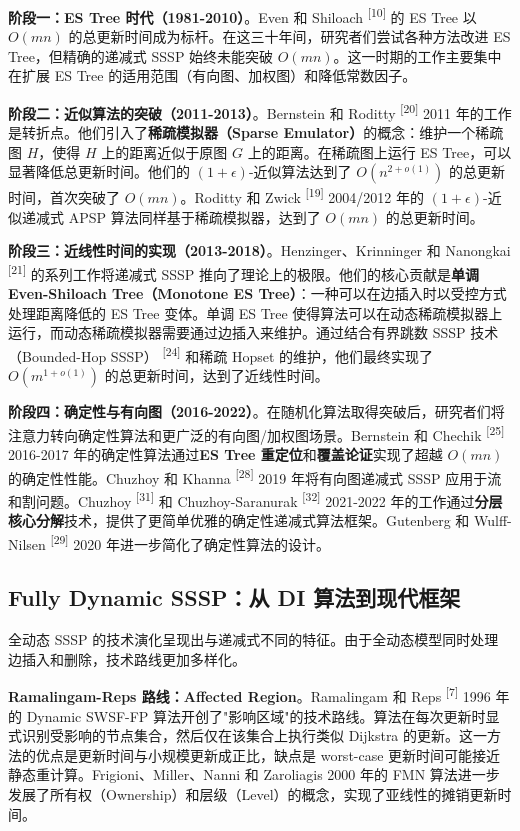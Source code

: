 \documentclass[12pt,a4paper]{ctexart}
\begin{document}
\textbf{阶段一：ES Tree 时代（1981-2010）}。Even 和 Shiloach \textsuperscript{[10]}  的 ES Tree 以 $O(mn)$ 的总更新时间成为标杆。在这三十年间，研究者们尝试各种方法改进 ES Tree，但精确的递减式 SSSP 始终未能突破 $O(mn)$。这一时期的工作主要集中在扩展 ES Tree 的适用范围（有向图、加权图）和降低常数因子。

\textbf{阶段二：近似算法的突破（2011-2013）}。Bernstein 和 Roditty \textsuperscript{[20]}  2011 年的工作是转折点。他们引入了\textbf{稀疏模拟器（Sparse Emulator）}的概念：维护一个稀疏图 $H$，使得 $H$ 上的距离近似于原图 $G$ 上的距离。在稀疏图上运行 ES Tree，可以显著降低总更新时间。他们的 $(1+\epsilon)$-近似算法达到了 $O(n^{2+o(1)})$ 的总更新时间，首次突破了 $O(mn)$。Roditty 和 Zwick \textsuperscript{[19]}  2004/2012 年的 $(1+\epsilon)$-近似递减式 APSP 算法同样基于稀疏模拟器，达到了 $O(mn)$ 的总更新时间。

\textbf{阶段三：近线性时间的实现（2013-2018）}。Henzinger、Krinninger 和 Nanongkai \textsuperscript{[21]}  的系列工作将递减式 SSSP 推向了理论上的极限。他们的核心贡献是\textbf{单调 Even-Shiloach Tree（Monotone ES Tree）}：一种可以在边插入时以受控方式处理距离降低的 ES Tree 变体。单调 ES Tree 使得算法可以在动态稀疏模拟器上运行，而动态稀疏模拟器需要通过边插入来维护。通过结合有界跳数 SSSP 技术（Bounded-Hop SSSP） \textsuperscript{[24]}  和稀疏 Hopset 的维护，他们最终实现了 $O(m^{1+o(1)})$ 的总更新时间，达到了近线性时间。

\textbf{阶段四：确定性与有向图（2016-2022）}。在随机化算法取得突破后，研究者们将注意力转向确定性算法和更广泛的有向图/加权图场景。Bernstein 和 Chechik \textsuperscript{[25]}  2016-2017 年的确定性算法通过\textbf{ES Tree 重定位}和\textbf{覆盖论证}实现了超越 $O(mn)$ 的确定性性能。Chuzhoy 和 Khanna \textsuperscript{[28]}  2019 年将有向图递减式 SSSP 应用于流和割问题。Chuzhoy \textsuperscript{[31]}  和 Chuzhoy-Saranurak \textsuperscript{[32]}  2021-2022 年的工作通过\textbf{分层核心分解}技术，提供了更简单优雅的确定性递减式算法框架。Gutenberg 和 Wulff-Nilsen \textsuperscript{[29]}  2020 年进一步简化了确定性算法的设计。

\subsection{Fully Dynamic SSSP：从 DI 算法到现代框架}

全动态 SSSP 的技术演化呈现出与递减式不同的特征。由于全动态模型同时处理边插入和删除，技术路线更加多样化。

\textbf{Ramalingam-Reps 路线：Affected Region}。Ramalingam 和 Reps \textsuperscript{[7]}  1996 年的 Dynamic SWSF-FP 算法开创了"影响区域"的技术路线。算法在每次更新时显式识别受影响的节点集合，然后仅在该集合上执行类似 Dijkstra 的更新。这一方法的优点是更新时间与小规模更新成正比，缺点是 worst-case 更新时间可能接近静态重计算。Frigioni、Miller、Nanni 和 Zaroliagis 2000 年的 FMN 算法进一步发展了所有权（Ownership）和层级（Level）的概念，实现了亚线性的摊销更新时间。
\end{document}
